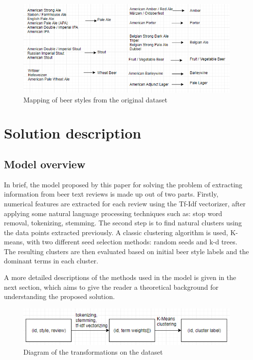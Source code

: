 \documentclass[12pt]{article}
\begin{document}
	\begin{figure}
		\includegraphics[width=\linewidth]{resources/MappingDiagram.png}
		\caption{Mapping of beer styles from the original dataset}
		\label{fig:styleMapping}
	\end{figure}

	\section{Solution description}
	\subsection{Model overview}
	In brief, the model proposed by this paper for solving the problem of extracting information from beer text reviews is made up out of two parts. Firstly, numerical features are extracted for each review using the Tf-Idf vectorizer, after applying some natural language processing techniques such as: stop word removal, tokenizing, stemming. The second step is to find natural clusters using the data points extracted previously. A classic clustering algorithm is used, K-means, with two different seed selection methods: random seeds and k-d trees. The resulting clusters are then evaluated based on initial beer style labels and the dominant terms in each cluster. 
	
	A more detailed descriptions of the methods used in the model is given in the next section, which aims to give the reader a theoretical background for understanding the proposed solution.

	\begin{figure}[H]
		\includegraphics[width=\linewidth]{resources/model.png}
		\caption{Diagram of the transformations on the dataset}
		\label{fig:modelOverview}
	\end{figure}
\end{document}
